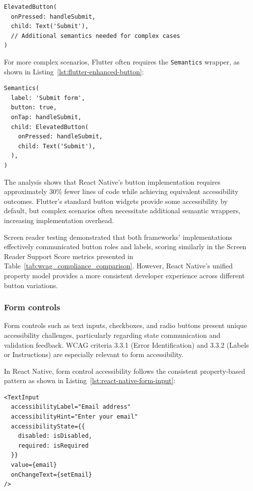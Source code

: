 \begin{lstlisting}[style=DartStyle, caption=Accessible button in Flutter, label=lst:flutter-button]
ElevatedButton(
  onPressed: handleSubmit,
  child: Text('Submit'),
  // Additional semantics needed for complex cases
)
\end{lstlisting}

For more complex scenarios, Flutter often requires the \texttt{Semantics} wrapper, as shown in Listing~\ref{lst:flutter-enhanced-button}:

\begin{lstlisting}[style=DartStyle, caption=Enhanced button accessibility in Flutter, label=lst:flutter-enhanced-button]
Semantics(
  label: 'Submit form',
  button: true,
  onTap: handleSubmit,
  child: ElevatedButton(
    onPressed: handleSubmit,
    child: Text('Submit'),
  ),
)
\end{lstlisting}

\FloatBarrier

The analysis shows that React Native's button implementation requires approximately 30\% fewer lines of code while achieving equivalent accessibility outcomes. Flutter's standard button widgets provide some accessibility by default, but complex scenarios often necessitate additional semantic wrappers, increasing implementation overhead.

Screen reader testing demonstrated that both frameworks' implementations effectively communicated button roles and labels, scoring similarly in the Screen Reader Support Score metrics presented in Table~\ref{tab:wcag_compliance_comparison}. However, React Native's unified property model provides a more consistent developer experience across different button variations.

\subsubsection{Form controls}
\label{subsubsec:form-controls}

Form controls such as text inputs, checkboxes, and radio buttons present unique accessibility challenges, particularly regarding state communication and validation feedback. WCAG criteria 3.3.1 (Error Identification) and 3.3.2 (Labels or Instructions) are especially relevant to form accessibility.

In React Native, form control accessibility follows the consistent property-based pattern as shown in Listing~\ref{lst:react-native-form-input}:

\begin{lstlisting}[style=ReactNativeStyle, caption=Accessible form input in React Native, label=lst:react-native-form-input]
<TextInput
  accessibilityLabel="Email address"
  accessibilityHint="Enter your email"
  accessibilityState={{ 
    disabled: isDisabled,
    required: isRequired 
  }}
  value={email}
  onChangeText={setEmail}
/>
\end{lstlisting}

